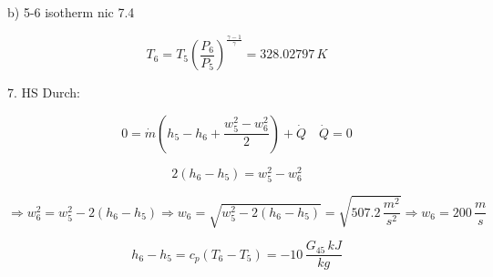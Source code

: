 b) 5-6 isotherm nic 7.4

\[
T_6 = T_5 \left( \frac{P_6}{P_5} \right)^{\frac{\gamma-1}{\gamma}} = 328.02797 \, K
\]

7. HS Durch:

\[
0 = \dot{m} \left( h_5 - h_6 + \frac{w_5^2 - w_6^2}{2} \right) + \dot{Q} \quad \dot{Q} = 0
\]

\[
2(h_6 - h_5) = w_5^2 - w_6^2
\]

\[
\Rightarrow w_6^2 = w_5^2 - 2(h_6 - h_5) \Rightarrow w_6 = \sqrt{w_5^2 - 2(h_6 - h_5)} = \sqrt{507.2 \, \frac{m^2}{s^2}} \Rightarrow w_6 = 200 \, \frac{m}{s}
\]

\[
h_6 - h_5 = c_p (T_6 - T_5) = -10 \, \frac{G_{45} \, kJ}{kg}
\]